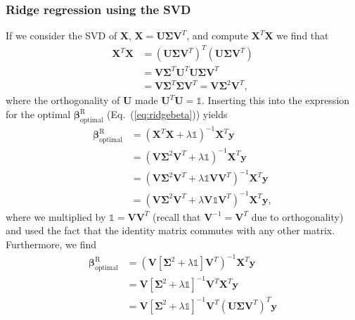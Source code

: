 \documentclass[a4paper]{article}
\newcommand{\eq} [1]{Eq.\ (\ref{eq:#1})}
\begin{document}
\begin{multicols}{2}
\subsubsection{Ridge regression using the SVD}
If we consider the SVD of $\mathbf{X}$, $\mathbf{X}=\mathbf{U}\bm\Sigma \mathbf{V}^T$, and compute $\mathbf{X}^T\mathbf{X}$ we find that 
\begin{align}
\mathbf{X}^T\mathbf{X} &= \left(\mathbf{U}\bm\Sigma \mathbf{V}^T\right)^T \left(\mathbf{U}\bm\Sigma \mathbf{V}^T\right) \nonumber \\
%
&= \mathbf{V}\bm\Sigma^T \mathbf{U}^T \mathbf{U}\bm\Sigma \mathbf{V}^T \nonumber \\
%
&= \mathbf{V}\bm\Sigma^T \bm\Sigma \mathbf{V}^T = \mathbf{V}\bm\Sigma^2\mathbf{V}^T,
\end{align}
where the orthogonality of $\mathbf{U}$ made $\mathbf{U}^T\mathbf{U}=\mathds{1}$. Inserting this into the expression for the optimal $\bm\beta_\text{optimal}^\text{R}$ (\eq{ridgebeta}) yields\autocite{trevor2009elements}
\begin{align}
\bm\beta^\text{R}_\text{optimal} &= \left(\mathbf{X}^T\mathbf{X}+\lambda\mathds{1}\right)^{-1}\mathbf{X}^T\mathbf{y} \nonumber \\
%
&= \left(\mathbf{V}\bm\Sigma^2\mathbf{V}^T +\lambda\mathds{1}\right)^{-1}\mathbf{X}^T\mathbf{y} \nonumber \\
%
&= \left(\mathbf{V}\bm\Sigma^2\mathbf{V}^T +\lambda\mathds{1}\mathbf{V}\mathbf{V}^T\right)^{-1}\mathbf{X}^T\mathbf{y} \nonumber \\
%
&= \left(\mathbf{V}\bm\Sigma^2\mathbf{V}^T +\lambda\mathbf{V}\mathds{1}\mathbf{V}^T\right)^{-1}\mathbf{X}^T\mathbf{y}, \nonumber
\end{align}
where we multiplied by $\mathds{1}=\mathbf{V}\mathbf{V}^T$ (recall that $\mathbf{V}^{-1}=\mathbf{V}^T$ due to orthogonality) and used the fact that the identity matrix commutes with any other matrix. Furthermore, we find
\begin{align}
\bm\beta^\text{R}_\text{optimal}&= \left(\mathbf{V}\left[\bm\Sigma^2 +\lambda\mathds{1}\right]\mathbf{V}^T\right)^{-1}\mathbf{X}^T\mathbf{y} \nonumber \\
%
&= \mathbf{V}\left[\bm\Sigma^2 +\lambda\mathds{1}\right]^{-1}\mathbf{V}^T\mathbf{X}^T\mathbf{y}  \label{eq:inv}\\
%
&= \mathbf{V}\left[\bm\Sigma^2 +\lambda\mathds{1}\right]^{-1}\mathbf{V}^T\left(\mathbf{U}\bm\Sigma \mathbf{V}^T\right)^T\mathbf{y} \nonumber \\

\end{align}
\end{multicols}
\end{document}
